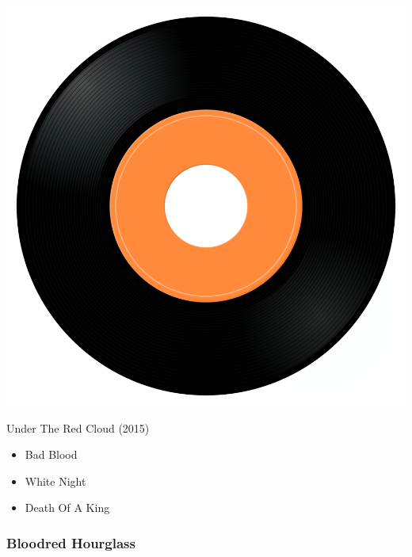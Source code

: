\begin{minipage}[t]{0.25\textwidth}\vspace{0pt}
\captionsetup{type=figure}
\includegraphics[width=\textwidth]{Images/cover.png}
\caption*{Under The Red Cloud (2015)}
\end{minipage}
\begin{minipage}[t]{0.25\textwidth}\vspace{0pt}
\begin{itemize}[nosep,leftmargin=1em,labelwidth=*,align=left]
	\setlength{\itemsep}{0pt}
	\item Bad Blood
	\item White Night
	\item Death Of A King
\end{itemize}
\end{minipage}

\subsubsection{Bloodred Hourglass}

